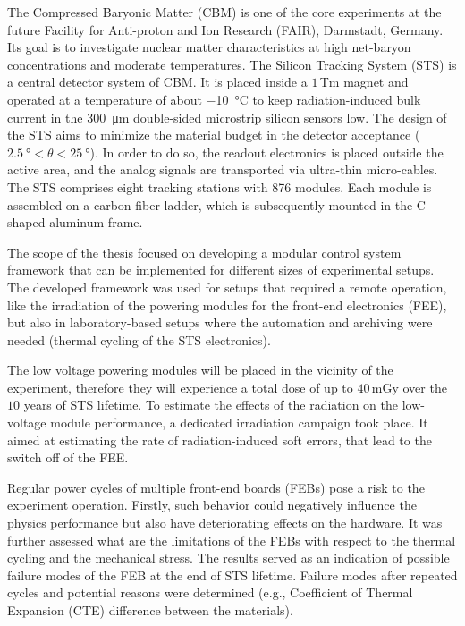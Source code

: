 The Compressed Baryonic Matter (CBM) is one of the core experiments at the future Facility for Anti-proton and Ion Research (FAIR), Darmstadt, Germany. Its goal is to investigate nuclear matter characteristics at high net-baryon concentrations and moderate temperatures. The Silicon Tracking System (STS) is a central detector system of CBM. It is placed inside a $1$\,Tm magnet and operated at a temperature of about \SI{-10}{\celsius} to keep radiation-induced bulk current in the \SI{300}{\micro\metre} double-sided microstrip silicon sensors low. The design of the STS aims to minimize the material budget in the detector acceptance ($\SI{2.5}{\degree} < \theta < \SI{25}{\degree}$). In order to do so, the readout electronics is placed outside the active area, and the analog signals are transported via ultra-thin micro-cables. The STS comprises eight tracking stations with 876 modules. Each module is assembled on a carbon fiber ladder, which is subsequently mounted in the C-shaped aluminum frame. 

The scope of the thesis focused on developing a modular control system framework that can be implemented for different sizes of experimental setups. The developed framework was used for setups that required a remote operation, like the irradiation of the powering modules for the front-end electronics (\gls{FEE}), but also in laboratory-based setups where the automation and archiving were needed (thermal cycling of the \gls{STS} electronics).

The low voltage powering modules will be placed in the vicinity of the experiment, therefore they will experience a total dose of up to $40$\,mGy over the $10$ years of \gls{STS} lifetime. To estimate the effects of the radiation on the low-voltage module performance, a dedicated irradiation campaign took place. It aimed at estimating the rate of radiation-induced soft errors, that lead to the switch off of the \gls{FEE}.

Regular power cycles of multiple front-end boards (\glspl{FEB}) pose a risk to the experiment operation.  Firstly, such behavior could negatively influence the physics performance but also have deteriorating effects on the hardware. It was further assessed what are the limitations of the \glspl{FEB} with respect to the thermal cycling and the mechanical stress. The results served as an indication of possible failure modes of the \gls{FEB} at the end of \gls{STS} lifetime. Failure modes after repeated cycles and potential reasons were determined (e.g., Coefficient of Thermal Expansion (\gls{CTE}) difference between the materials). 


